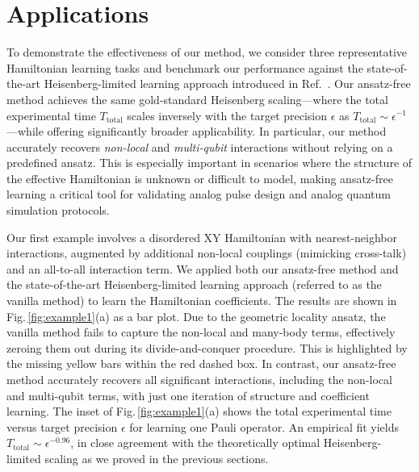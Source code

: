 \documentclass[twocolumn,superscriptaddress,aps,showpacs,amsmath,amstex,amssymb,citeautoscript,floatfix,pra,preprintnumbers]{revtex4-2}
\theoremstyle{plain}
\theoremstyle{plain}
\theoremstyle{plain}
\theoremstyle{plain}
\theoremstyle{plain}
\theoremstyle{plain}
\newcommand{\figref}[1]{Fig.\,\ref{#1}}
\begin{document}
\section{Applications}



To demonstrate the effectiveness of our method, we consider three representative Hamiltonian learning tasks and benchmark our performance against the state-of-the-art Heisenberg-limited learning approach introduced in Ref.~\cite{HuangTongFangSu2023learning}. Our ansatz-free method achieves the same gold-standard Heisenberg scaling—where the total experimental time $T_{\text{total}}$ scales inversely with the target precision $\epsilon$ as $T_{\text{total}} \sim \epsilon^{-1}$—while offering significantly broader applicability. In particular, our method accurately recovers \emph{non-local} and \emph{multi-qubit} interactions without relying on a predefined ansatz. This is especially important in scenarios where the structure of the effective Hamiltonian is unknown or difficult to model, making ansatz-free learning a critical tool for validating analog pulse design and analog quantum simulation protocols.

Our first example involves a disordered XY Hamiltonian with nearest-neighbor interactions, augmented by additional non-local couplings (mimicking cross-talk) and an all-to-all interaction term. We applied both our ansatz-free method and the state-of-the-art Heisenberg-limited learning approach \cite{HuangTongFangSu2023learning} (referred to as the vanilla method) to learn the Hamiltonian coefficients. The results are shown in \figref{fig:example1}(a) as a bar plot. Due to the geometric locality ansatz, the vanilla method fails to capture the non-local and many-body terms, effectively zeroing them out during its divide-and-conquer procedure. This is highlighted by the missing yellow bars within the red dashed box. In contrast, our ansatz-free method accurately recovers all significant interactions, including the non-local and multi-qubit terms, with just one iteration of structure and coefficient learning. The inset of \figref{fig:example1}(a) shows the total experimental time versus target precision $\epsilon$ for learning one Pauli operator. An empirical fit yields $T_{\text{total}} \sim \epsilon^{-0.96}$, in close agreement with the theoretically optimal Heisenberg-limited scaling as we proved in the previous sections.
\end{document}
